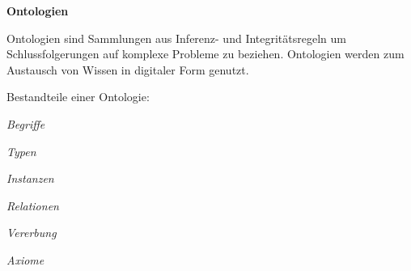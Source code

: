 \textbf{Ontologien}

Ontologien sind Sammlungen aus Inferenz- und Integrit{\"a}tsregeln um
Schlussfolgerungen auf komplexe Probleme zu beziehen. Ontologien werden zum
Austausch von Wissen in digitaler Form genutzt.

Bestandteile einer Ontologie:

 \begin{compactenum}[I]
     \item \textit{Begriffe}
     \item \textit{Typen}
     \item \textit{Instanzen}
     \item \textit{Relationen}
     \item \textit{Vererbung}
     \item \textit{Axiome}
   \end{compactenum}
